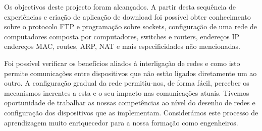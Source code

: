 Os objectivos deste projecto foram alcançados. A partir desta sequência de experiências e criação de aplicação de download foi possível obter conhecimento sobre o protocolo FTP e programação sobre sockets, configuração de uma rede de computadores composta por computadores, switches e routers, endereços IP endereços MAC, routes, ARP, NAT e mais especificidades não mencionadas.

Foi possível verificar os benefícios aliados à interligação de redes e como isto permite comunicações entre dispositivos que não estão ligados diretamente um ao outro. A configuração gradual da rede permitiu-nos, de forma fácil, perceber os mecanismos inerentes a esta e o seu impacto nas comunicações atuais. Tivemos oportunidade de trabalhar as nossas competências ao nível do desenho de redes e configuração dos dispositivos que as implementam. Considerámos este processo de aprendizagem muito enriquecedor para a nossa formação como engenheiros.